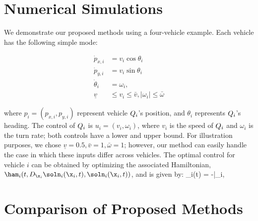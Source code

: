 \section{Numerical Simulations \label{sec:sim}}
We demonstrate our proposed methods using a four-vehicle example. Each vehicle has the following simple mode:

\begin{equation}
\label{eq:dyn_i}
\begin{aligned}
\dot{p}_{x,i} &= v_i \cos \theta_i \\
\dot{p}_{y,i} &= v_i \sin \theta_i \\
\dot{\theta}_i &= \omega_i, \\
\underline{v} &\le v_i \le \bar{v}, |\omega_i| \le \bar{\omega}
\end{aligned}
\end{equation}

\noindent where $p_i = (p_{x,i}, p_{y,i})$ represent vehicle $Q_i$'s position, and $\theta_i$ represents $Q_i$'s heading. The control of $Q_i$ is $u_i = (v_i, \omega_i)$, where $v_i$ is the speed of $Q_i$ and $\omega_i$ is the turn rate; both controls have a lower and upper bound. For illustration purposes, we chose $\underline{v} = 0.5, \bar{v} = 1, \bar\omega = 1$; however, our method can easily handle the case in which these inputs differ across vehicles. The optimal control for vehicle $i$ can be obtained by optimizing the associated Hamiltonian, $\ham_i(t, D_{\x_i}\soln_i(\x_i,t), \soln_i(\x_i,t))$, and is given by:
%
%
\bq
\omega_i(t) = -\bar{\omega}_i,
\eq




\section{Comparison of Proposed Methods}